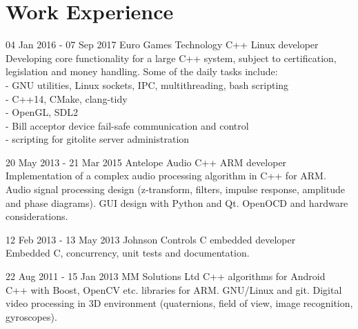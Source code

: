 \documentclass{tccv}
\begin{document}
\pagebreak
\section{Work Experience}
\begin{eventlist}
\item{04 Jan 2016 - 07 Sep 2017}
     {Euro Games Technology}
     {C++ Linux developer}                                           \\
Developing core functionality for a large C++ system, subject to certification, legislation and money handling.
Some of the daily tasks include:                                     \\
- GNU utilities, Linux sockets, IPC, multithreading, bash scripting  \\
- C++14, CMake, clang-tidy                                           \\
- OpenGL, SDL2                                                       \\
- Bill acceptor device fail-safe communication and control            \\
- scripting for gitolite server administration                       \\

\item{20 May 2013 - 21 Mar 2015}
     {Antelope Audio}
     {C++ ARM developer}              \\
Implementation of a complex audio processing algorithm in C++ for ARM.
Audio signal processing design (z-transform, filters, impulse response, amplitude and phase diagrams).
GUI design with Python and Qt.
OpenOCD and hardware considerations.   \\

\item{12 Feb 2013 - 13 May 2013}
     {Johnson Controls}
     {C embedded developer} \\
Embedded C, concurrency, unit tests and documentation.  \\

\item{22 Aug 2011 - 15 Jan 2013}
     {MM Solutions Ltd}
     {C++ algorithms for Android} \\
C++ with Boost, OpenCV etc. libraries for ARM.
GNU/Linux and git.
Digital video processing in 3D environment (quaternions, field of view, image recognition, gyroscopes).
\end{eventlist}
\end{document}
